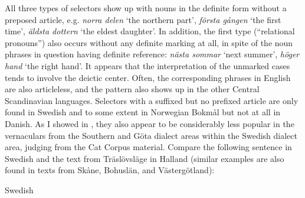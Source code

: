 \begin{styleBodytextC}
All three types of selectors show up with nouns in the definite form without a preposed article, e.g. \textit{norra delen} ‘the northern part’, \textit{första gången} ‘the first time’, \textit{äldsta dottern} ‘the eldest daughter’. In addition, the first type (“relational pronouns”) also occurs without any definite marking at all, in spite of the noun phrases in question having definite reference: \textit{nästa sommar} ‘next summer’, \textit{höger hand} ‘the right hand’. It appears that the interpretation of the unmarked cases tends to involve the deictic center. Often, the corresponding phrases in English are also articleless, and the pattern also shows up in the other Central Scandinavian languages. Selectors with a suffixed but no prefixed article are only found in Swedish and to some extent in Norwegian Bokmål but not at all in Danish. As I showed in \citet{Dahl2003}, they also appear to be considerably less popular in the vernaculars from the Southern and Göta dialect areas within the Swedish dialect area, judging from the Cat Corpus material. Compare the following sentence in Swedish and the text from Träslövsläge in Halland (similar examples are also found in texts from Skåne, Bohuslän, and Västergötland):

\end{styleBodytextC}


\begin{listWWNumileveli}
\item {}

\end{listWWNumileveli}

\begin{listWWNumlxiileveli}
\item {}

\begin{styleExLtrTbl}
Swedish

\end{styleExLtrTbl}

\end{listWWNumlxiileveli}

